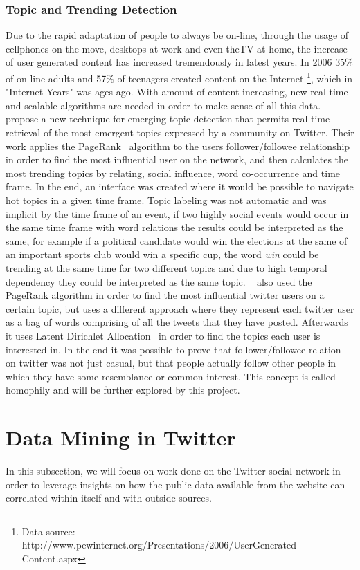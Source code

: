 \subsubsection{Topic and Trending Detection} 
\label{ssub:real_time_topic_and_trending_detection}
Due to the rapid adaptation of people to always be on-line, through the usage of cellphones on the move, desktops at work and even theTV at home, the increase of user generated content has increased tremendously in latest years. In 2006 35\% of on-line adults and 57\% of teenagers created content on the Internet \footnote{ Data source: http://www.pewinternet.org/Presentations/2006/UserGenerated-Content.aspx}, which in "Internet Years" was ages ago.
With amount of content increasing, new real-time and scalable algorithms are needed in order to make sense of all this data.
~\citet{Cataldi2010} propose a new technique for emerging topic detection that permits real-time retrieval of the most emergent topics expressed by a community on Twitter. Their work applies the PageRank~\cite{Pagerank1998} algorithm to the users follower/followee relationship in order to find the most influential user on the network, and then calculates the most trending topics by relating, social influence, word co-occurrence and time frame. In the end, an interface was created where it would be possible to navigate hot topics in a given time frame. Topic labeling was not automatic and was implicit by the time frame of an event, if two highly social events would occur in the same time frame with word relations the results could be interpreted as the same, for example if a political candidate would win the elections at the same of an important sports club would win a specific cup, the word \emph{win} could be trending at the same time for two different topics and due to high temporal dependency they could be interpreted as the same topic.
~\citet{Weng2010} also used the PageRank algorithm in order to find the most influential twitter users on a certain topic, but uses a different approach where they represent each twitter user as a bag of words comprising of all the tweets that they have posted. Afterwards it uses Latent Dirichlet Allocation~\cite{Blei2003} in order to find the topics each user is interested in. In the end it was possible to prove that follower/followee relation on twitter was not just casual, but that people actually follow other people in which they have some resemblance or common interest. This concept is called homophily and will be further explored by this project.

\section{Data Mining in Twitter } 
\label{sec:data_mining_in_twitter_}
In this subsection, we will focus on work done on the Twitter social network in order to leverage insights on how the public data available from the website can correlated within itself and with outside sources. 

